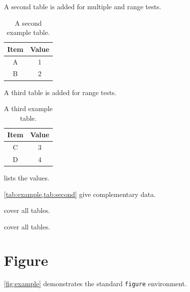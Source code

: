 \documentclass[11pt]{../class/journalpaper}
\begin{document}
A second table is added for multiple and range tests.

\begin{table}[htbp]
    \centering

    \caption{A second example table.}
    \label{tab:second}

    \begin{tabular}{cc}
        \toprule
        Item & Value \\
        \midrule
        A & 1 \\
        B & 2 \\
        \bottomrule
    \end{tabular}
\end{table}

A third table is added for range tests.

\begin{table}[htbp]
    \centering

    \caption{A third example table.}
    \label{tab:third}

    \begin{tabular}{cc}
        \toprule
        Item & Value \\
        \midrule
        C & 3 \\
        D & 4 \\
        \bottomrule
    \end{tabular}
\end{table}

 lists the values.

\cref{tab:example,tab:second} give complementary data.

 cover all tables.

 cover all tables.



\section{Figure}

\cref{fig:example} demonstrates the standard
\texttt{figure} environment.
\end{document}
